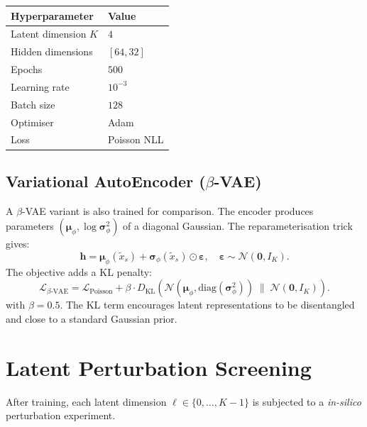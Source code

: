 \documentclass[11pt,a4paper]{article}
\newcommand{\N}{\mathcal{N}}
\theoremstyle{definition}
\begin{document}
\begin{center}
\begin{tabular}{ll}
\toprule
Hyperparameter & Value\\
\midrule
Latent dimension $K$ & $4$\\
Hidden dimensions & $[64, 32]$\\
Epochs & $500$\\
Learning rate & $10^{-3}$\\
Batch size & $128$\\
Optimiser & Adam\\
Loss & Poisson NLL\\
\bottomrule
\end{tabular}
\end{center}

\subsection{Variational AutoEncoder ($\beta$-VAE)}

A $\beta$-VAE variant is also trained for comparison.  The encoder
produces parameters $(\bm{\mu}_\phi, \log\bm{\sigma}^2_\phi)$ of a diagonal
Gaussian. The reparameterisation trick gives:
\begin{equation}
  \bm{h} = \bm{\mu}_\phi(\tilde{x}_s) +
            \bm{\sigma}_\phi(\tilde{x}_s) \odot \bm{\varepsilon},
  \quad \bm{\varepsilon} \sim \N(\bm{0}, I_K).
\end{equation}
The objective adds a KL penalty:
\begin{equation}
  \mathcal{L}_{\beta\text{-VAE}} =
    \mathcal{L}_{\mathrm{Poisson}} +
    \beta \cdot D_{\mathrm{KL}}\!\left(
      \N(\bm{\mu}_\phi, \mathrm{diag}(\bm{\sigma}^2_\phi))
      \;\Big\|\;
      \N(\bm{0}, I_K)
    \right).
\end{equation}
with $\beta = 0.5$.  The KL term encourages latent representations to be
disentangled and close to a standard Gaussian prior.

\section{Latent Perturbation Screening}
\label{sec:screening}

After training, each latent dimension $\ell \in \{0,\ldots,K-1\}$ is
subjected to a \emph{in-silico} perturbation experiment.
\end{document}

